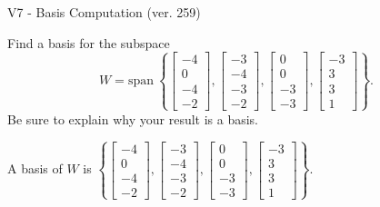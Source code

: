 \begin{exercise}
  \begin{exerciseTitle}V7 - Basis Computation (ver. 259)\end{exerciseTitle}
  \begin{exerciseStatement}
    Find a basis for the subspace 
\[W=\mathrm{span}\ \left\{\left[\begin{array}{r}
-4 \\
0 \\
-4 \\
-2
\end{array}\right] , \left[\begin{array}{r}
-3 \\
-4 \\
-3 \\
-2
\end{array}\right] , \left[\begin{array}{r}
0 \\
0 \\
-3 \\
-3
\end{array}\right] , \left[\begin{array}{r}
-3 \\
3 \\
3 \\
1
\end{array}\right]\right\}.\]
 Be sure to explain why your result is a basis.


  \end{exerciseStatement}
  \begin{exerciseAnswer}
   A basis of \(W\) is  \(\left\{\left[\begin{array}{r}
-4 \\
0 \\
-4 \\
-2
\end{array}\right] , \left[\begin{array}{r}
-3 \\
-4 \\
-3 \\
-2
\end{array}\right] , \left[\begin{array}{r}
0 \\
0 \\
-3 \\
-3
\end{array}\right] , \left[\begin{array}{r}
-3 \\
3 \\
3 \\
1
\end{array}\right]\right\}\).
  


  \end{exerciseAnswer}
\end{exercise}